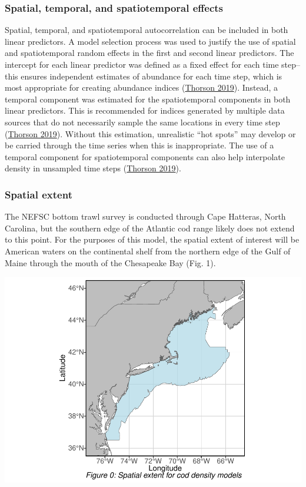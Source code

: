 \documentclass[
]{article}
\begin{document}
\hypertarget{spatial-temporal-and-spatiotemporal-effects}{%
\subsubsection{Spatial, temporal, and spatiotemporal effects}\label{spatial-temporal-and-spatiotemporal-effects}}

Spatial, temporal, and spatiotemporal autocorrelation can be included in both linear predictors. A model selection process was used to justify the use of spatial and spatiotemporal random effects in the first and second linear predictors. The intercept for each linear predictor was defined as a fixed effect for each time step-- this ensures independent estimates of abundance for each time step, which is most appropriate for creating abundance indices (\protect\hyperlink{ref-thorson_2019}{Thorson 2019}). Instead, a temporal component was estimated for the spatiotemporal components in both linear predictors. This is recommended for indices generated by multiple data sources that do not necessarily sample the same locations in every time step (\protect\hyperlink{ref-thorson_2019}{Thorson 2019}). Without this estimation, unrealistic ``hot spots'' may develop or be carried through the time series when this is inappropriate. The use of a temporal component for spatiotemporal components can also help interpolate density in unsampled time steps (\protect\hyperlink{ref-thorson_2019}{Thorson 2019}).

\hypertarget{spatial-extent}{%
\subsubsection{Spatial extent}\label{spatial-extent}}

The NEFSC bottom trawl survey is conducted through Cape Hatteras, North Carolina, but the southern edge of the Atlantic cod range likely does not extend to this point. For the purposes of this model, the spatial extent of interest will be American waters on the continental shelf from the northern edge of the Gulf of Maine through the mouth of the Chesapeake Bay (Fig. 1).

\includegraphics{ToR1_TechPaper_files/figure-latex/total spatial extent-1.pdf}
\end{document}
